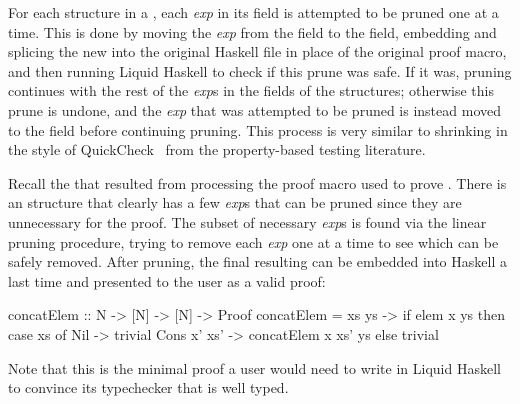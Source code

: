 For each  structure in a \LangBTerm, each \textit{exp} in its  field is attempted to be pruned one at a time.
This is done by moving the \textit{exp} from the  field to the  field, embedding and splicing the new \LangBTerm into the original Haskell file in place of the original proof macro, and then running Liquid Haskell to check if this prune was safe.
If it was, pruning continues with the rest of the \textit{exp}s in the  fields of the  structures; otherwise this prune is undone, and the \textit{exp} that was attempted to be pruned is instead moved to the  field before continuing pruning.
%
This process is very similar to shrinking in the style of
QuickCheck~\cite{ClaessenH00} from the property-based testing
literature.

Recall the \LangBTerm that resulted from processing the proof macro used to prove .
There is an  structure that clearly has a few \textit{exp}s that can be pruned since they are unnecessary for the proof.
The subset of necessary \textit{exp}s is found via the linear pruning procedure, trying to remove each \textit{exp} one at a time to see which can be safely removed.
After pruning, the final resulting \LangBTerm can be embedded into Haskell a last time and presented to the user as a valid proof:

\begin{code}
  concatElem :: N -> [N] -> [N] -> Proof
  concatElem = \x xs ys ->
    if elem x ys then
      case xs of
        Nil -> trivial
        Cons x' xs' -> concatElem x xs' ys
    else
      trivial
\end{code}
%
Note that this is the minimal proof a user would need to write
in Liquid Haskell to convince its typechecker that 
is well typed.



